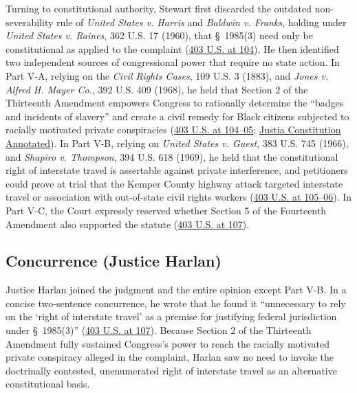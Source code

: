 \documentclass[12pt]{article}
\begin{document}
Turning to constitutional authority, Stewart first discarded the outdated non-severability rule of \textit{United States v. Harris} and \textit{Baldwin v. Franks}, holding under \textit{United States v. Raines}, 362 U.S. 17 (1960), that \S~1985(3) need only be constitutional as applied to the complaint (\href{https://supreme.justia.com/cases/federal/us/403/88/}{403 U.S. at 104}). He then identified two independent sources of congressional power that require no state action. In Part V-A, relying on the \textit{Civil Rights Cases}, 109 U.S. 3 (1883), and \textit{Jones v. Alfred H. Mayer Co.}, 392 U.S. 409 (1968), he held that Section 2 of the Thirteenth Amendment empowers Congress to rationally determine the ``badges and incidents of slavery'' and create a civil remedy for Black citizens subjected to racially motivated private conspiracies (\href{https://supreme.justia.com/cases/federal/us/403/88/}{403 U.S. at 104--05}; \href{https://law.justia.com/constitution/us/amendment-13/01-abolition-of-slavery.html}{Justia Constitution Annotated}). In Part V-B, relying on \textit{United States v. Guest}, 383 U.S. 745 (1966), and \textit{Shapiro v. Thompson}, 394 U.S. 618 (1969), he held that the constitutional right of interstate travel is assertable against private interference, and petitioners could prove at trial that the Kemper County highway attack targeted interstate travel or association with out-of-state civil rights workers (\href{https://supreme.justia.com/cases/federal/us/403/88/}{403 U.S. at 105--06}). In Part V-C, the Court expressly reserved whether Section 5 of the Fourteenth Amendment also supported the statute (\href{https://supreme.justia.com/cases/federal/us/403/88/}{403 U.S. at 107}).

\subsection{Concurrence (Justice Harlan)}

Justice Harlan joined the judgment and the entire opinion except Part V-B. In a concise two-sentence concurrence, he wrote that he found it ``unnecessary to rely on the `right of interstate travel' as a premise for justifying federal jurisdiction under \S~1985(3)'' (\href{https://supreme.justia.com/cases/federal/us/403/88/}{403 U.S. at 107}). Because Section 2 of the Thirteenth Amendment fully sustained Congress's power to reach the racially motivated private conspiracy alleged in the complaint, Harlan saw no need to invoke the doctrinally contested, unenumerated right of interstate travel as an alternative constitutional basis.
\end{document}
